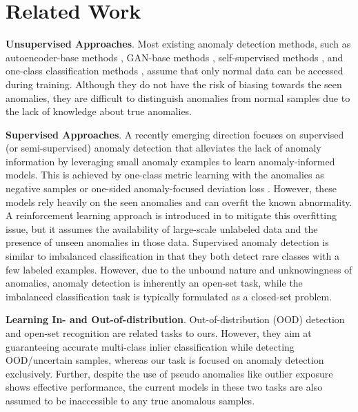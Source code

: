 \documentclass[10pt,twocolumn,letterpaper]{article}
\begin{document}
\section{Related Work}
\textbf{Unsupervised Approaches}. Most existing anomaly detection methods, such as autoencoder-base methods \cite{zhou2017anomaly, gong2019memorizing, Hou_2021_ICCV, Park_2020_CVPR, zhou2020encoding}, GAN-base methods \cite{schlegl2019f, Perera_2019_CVPR, sabokrou2018adversarially, zaheer2020old}, self-supervised methods \cite{golan2018deep,wang2019effective,bergman2020goad,georgescu2021anomaly, sohn2020learning, li2021cutpaste,tian2021constrained}, and one-class classification methods \cite{perera2019learning, ruff2018deep, chalapathy2018anomaly,chen2021deep}, assume that only normal data can be accessed during training.
Although they do not have the risk of biasing towards the seen anomalies, they are difficult to distinguish anomalies from normal samples due to the lack of knowledge about true anomalies.

\textbf{Supervised Approaches}. A recently emerging direction focuses on supervised (or semi-supervised) anomaly detection that alleviates the lack of anomaly information by leveraging small anomaly examples to learn anomaly-informed models. This is achieved by one-class metric learning with the anomalies as negative samples \cite{pang2018learning,ruff2019deep,liu2019margin,gornitz2013toward} or one-sided anomaly-focused deviation loss \cite{pang2019deep,pang2021explainable,zhang2020viral}. However, these models rely heavily on the seen anomalies and can overfit the known abnormality. A reinforcement learning approach is introduced in \cite{pang2021toward} to mitigate this overfitting issue, but it assumes the availability of large-scale unlabeled data and the presence of unseen anomalies in those data.
Supervised anomaly detection is similar to imbalanced classification \cite{he2009imbalance, branco2016survey, liu2019large} in that they both detect rare classes with
a few labeled examples. However, 
due to the unbound nature and unknowingness of anomalies, anomaly detection is inherently an open-set task, while the imbalanced classification task is typically formulated as a closed-set problem. 

\textbf{Learning In- and Out-of-distribution}. Out-of-distribution (OOD) detection \cite{hendrycks17baseline, ren2019likelihood,huang2021mos, Lin_2021_CVPR, Zaeemzadeh_2021_CVPR, hendrycks2018deep} and open-set recognition \cite{scheirer2012toward,bendale2016towards, zhou2021learning, Yue_2021_CVPR, liu2019margin} are related tasks to ours. However, they aim at guaranteeing accurate multi-class inlier classification while detecting OOD/uncertain samples, whereas our task is focused on anomaly detection exclusively.
Further, despite the use of pseudo anomalies like outlier exposure \cite{hendrycks2018deep,huang2021mos} shows effective performance, the current models in these two tasks are also assumed to be inaccessible to any true anomalous samples. 
\end{document}
